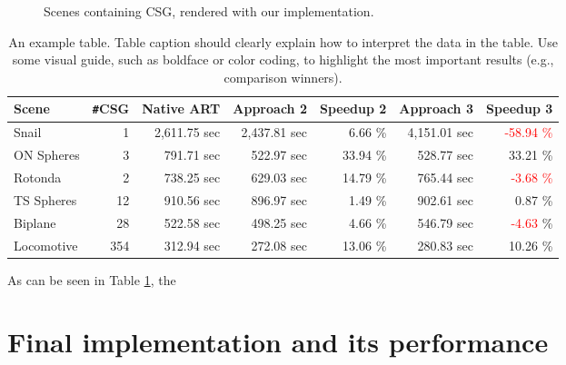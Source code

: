 \begin{figure}
	\hfill
	
	\caption{Scenes containing CSG, rendered with our implementation.}
	\label{fig:csg_figures}
\end{figure}

\begin{table}
	\centering
	{\footnotesize\sf
		\begin{tabular}{lrrrrrr}
			\toprule
			Scene & \Verb!#!CSG & Native ART & Approach 2 & Speedup 2 & Approach 3 & Speedup 3 \\ 
			\midrule
			Snail & 1 & 2,611.75 sec & 2,437.81 sec & 6.66 \% & 4,151.01 sec & \textcolor{red}{-58.94 \%}  \\
			ON Spheres & 3 & 791.71 sec & 522.97 sec & 33.94 \% & 528.77 sec & 33.21 \% \\
			Rotonda & 2 & 738.25 sec & 629.03 sec & 14.79 \% & 765.44 sec & \textcolor{red}{-3.68 \%}  \\
			\addlinespace %
			TS Spheres & 12 & 910.56 sec & 896.97 sec & 1.49 \% & 902.61 sec & 0.87 \% \\
			Biplane & 28 & 522.58 sec & 498.25 sec & 4.66 \% & 546.79 sec & \textcolor{red}{-4.63} \% \\
			Locomotive & 354 & 312.94 sec & 272.08 sec & 13.06 \% & 280.83 sec & 10.26 \% \\
			\bottomrule
	\end{tabular}}
	\caption{An example table. Table caption should clearly explain how to interpret the data in the table. Use some visual guide, such as boldface or color coding, to highlight the most important results (e.g., comparison winners).}
	\label{tab:csg}
\end{table}

As can be seen in Table \ref{tab:csg}, the


\section{Final implementation and its performance}
\label{sec:result_normal}

